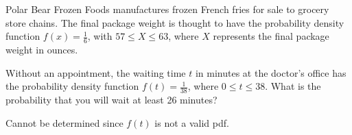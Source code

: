 \documentclass[noanswers]{exam}
\begin{document}
\begin{questions}
\begin{parts}
\end{parts}

\question Polar Bear Frozen Foods manufactures frozen French fries for sale to grocery store chains. The final package weight is thought to have the probability density function $f(x)=\frac{1}{6}$, with $57\leq X\leq 63$, where $X$ represents the final package weight in ounces.

\vspace{3mm}



\question Without an appointment, the waiting time $t$ in minutes at the doctor's office has the probability density function $f(t)=\frac{1}{38}$, where $0\leq t\leq 38$. What is the probability that you will wait at least 26 minutes?

\vspace{3mm}

\begin{choices}
\choice Cannot be determined since $f(t)$ is not a valid pdf.
\end{choices}

\vspace{3mm}


\end{questions}

\end{document}
